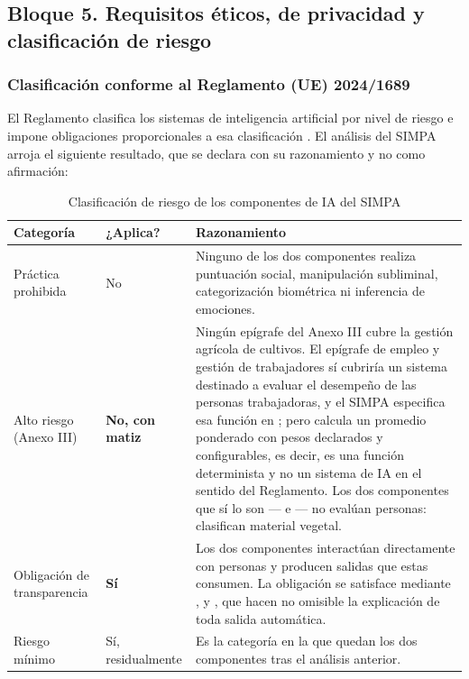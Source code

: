\subsection{Bloque 5. Requisitos éticos, de privacidad y clasificación de riesgo}

\subsubsection*{Clasificación conforme al Reglamento (UE) 2024/1689}

El Reglamento clasifica los sistemas de inteligencia artificial por nivel de riesgo e impone
obligaciones proporcionales a esa clasificación \cite{aiact2024}. El análisis del SIMPA arroja el
siguiente resultado, que se declara con su razonamiento y no como afirmación:

\begin{table}[H]
\centering\footnotesize
\caption{Clasificación de riesgo de los componentes de IA del SIMPA}
\label{tab:riesgo-ia}
\begin{tabular}{|L{3.4cm}|C{2.6cm}|L{9.2cm}|}
\hline
{}\textbf{Categoría} & \textbf{¿Aplica?} & \textbf{Razonamiento}\\ \hline
Práctica prohibida & No & Ninguno de los dos componentes realiza puntuación social, manipulación subliminal, categorización biométrica ni inferencia de emociones.\\ \hline
Alto riesgo (Anexo III) & \textbf{No, con matiz} & Ningún epígrafe del Anexo III cubre la gestión agrícola de cultivos. El epígrafe de empleo y gestión de trabajadores sí cubriría un sistema destinado a evaluar el desempeño de las personas trabajadoras, y el SIMPA especifica esa función en ; pero  calcula un promedio ponderado con pesos declarados y configurables, es decir, es una función determinista y no un sistema de IA en el sentido del Reglamento. Los dos componentes que sí lo son --- e --- no evalúan personas: clasifican material vegetal.\\ \hline
Obligación de transparencia & \textbf{Sí} & Los dos componentes interactúan directamente con personas y producen salidas que estas consumen. La obligación se satisface mediante ,  y , que hacen no omisible la explicación de toda salida automática.\\ \hline
Riesgo mínimo & Sí, residualmente & Es la categoría en la que quedan los dos componentes tras el análisis anterior.\\ \hline
\end{tabular}
\end{table}

